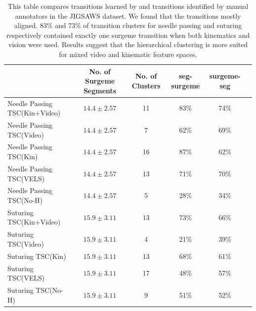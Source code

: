\begin{table}
\caption{This table compares transitions learned by \tsc and transitions identified by manual annotators in the JIGSAWS dataset. We found that the transitions mostly aligned. $83\%$ and $73\%$ of transition clusters for needle passing and suturing respectively contained exactly one surgeme transition when both kinematics and vision were used. Results suggest that the hierarchical clustering is more suited for mixed video and kinematic feature spaces.}
\centering
\scriptsize
\begin{tabular}{| l | c | c | c | c | c |}
\hline
 & No. of Surgeme Segments & No. of Clusters & seg-surgeme & surgeme-seg \\ 
\hline
Needle Passing TSC(Kin+Video)  & $14.4 \pm 2.57$ & 11 & 83\% & 74\% \\ \hline
Needle Passing TSC(Video) & $14.4 \pm 2.57$ & 7 & 62\% & 69\% \\ \hline
Needle Passing TSC(Kin) & $14.4 \pm 2.57$ & 16 & 87\% & 62\% \\ \hline
Needle Passing TSC(VELS) & $14.4 \pm 2.57$ & 13 & 71\% & 70\% \\ \hline
Needle Passing TSC(No-H)  & $14.4 \pm 2.57$ & 5 & 28\% & 34\% \\\hline
\hline
Suturing TSC(Kin+Video) & $15.9 \pm 3.11$ & 13 & 73\% & 66\% \\ \hline
Suturing TSC(Video) & $15.9 \pm 3.11$ & 4 & 21\% & 39\% \\ \hline
Suturing TSC(Kin) & $15.9 \pm 3.11$ & 13 & 68\% & 61\% \\ \hline
Suturing TSC(VELS) & $15.9 \pm 3.11$ & 17 & 48\% & 57\% \\ \hline
Suturing TSC(No-H) & $15.9 \pm 3.11$ & 9 & 51\% & 52\% \\ \hline
\end{tabular}
 \label{exp:surgemes}
\end{table}


